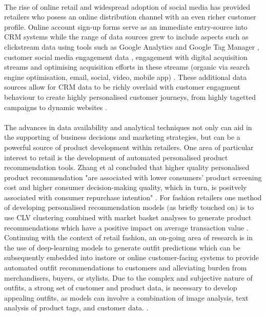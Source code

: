 \documentclass[11pt]{article}
\theoremstyle{plain}
\theoremstyle{definition}
\begin{document}
\\
The rise of online retail and widespread adoption of social media has provided retailers who posess an online distribution channel with an even richer customer profile. Online account sign-up forms serve as an immediate entry-source into CRM systems while the range of data sources grew to include aspects such as clickstream data using tools such as Google Analytics and Google Tag Manager \cite{BRADLOW201779}, customer social media engagement data \cite{Batrinca:2015aa}, engagement with digital acquisition streams and optimising acquisition efforts in these streams (organic via search engine optimisation, email, social, video, mobile app) \cite{Walters:2015aa}. These additional data sources allow for CRM data to be richly overlaid with customer engagment behaviour to create highly personalised customer journeys, from highly tagetted campaigns to dynamic websites \cite{BRADLOW201779}.\\
\\
The advances in data availability and analytical techniques not only can aid in the supporting of business decisions and marketing strategies, but can be a powerful source of product development within retailers. One area of particular interest to retail is the development of automated personalised product recommendation tools. Zhang et al concluded that higher quality personalised product recommendation "are associated with lower consumers' product screening cost and higher consumer decision-making quality, which in turn, is positvely associated with consumer repurchase intention" \cite{10.2307/41409964}. For fashion retailers one method of developing personalised recommendation models $($as briefly touched on$)$ is to use CLV clustering combined with market basket analyses to generate product recommendations which have a positive impact on average transaction value \cite{RODRIGUES2016136}. Continuing with the context of retail fashion, an on-going area of research is in the use of deep-learning models to generate outfit predictions which can be subsequently embedded into instore or online customer-facing systems to provide automated outfit recommendations to customers and alleviating burden from merchandisers, buyers, or stylists.  Due to the complex and subjective nature of outfits, a strong set of customer and product data, is necessary to develop appealing outfits, as models can involve a combination of image analysis, text analysis of product tags, and customer data. \cite{Guan:2019aa}. \\
\\
\end{document}
